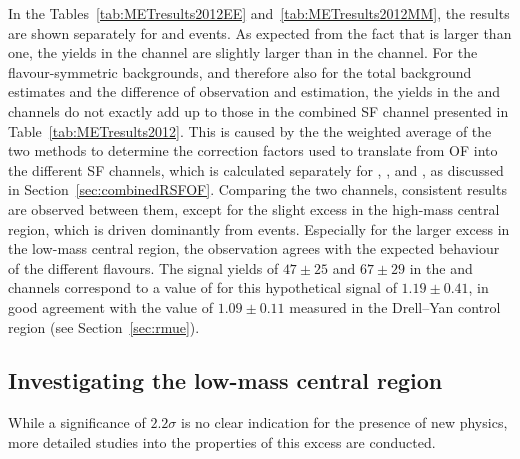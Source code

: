 
In the Tables~\ref{tab:METresults2012EE} and~\ref{tab:METresults2012MM}, the results are shown separately for \EE and \MM events. As expected from the fact that \rmue is larger than one, the yields in the \MM channel are slightly larger than in the \EE channel. For the flavour-symmetric backgrounds, and therefore also for the total background estimates and the difference of observation and estimation, the yields in the \EE and \MM channels do not exactly add up to those in the combined SF channel presented in Table~\ref{tab:METresults2012}. This is caused by the the weighted average of the two methods to determine the correction factors used to translate from OF into the different SF channels, which is calculated separately for \Rsfof, \Reeof, and \Rmmof, as discussed in Section~\ref{sec:combinedRSFOF}. Comparing the two channels, consistent results are observed between them, except for the slight excess in the high-mass central region, which is driven dominantly from \EE events. Especially for the larger excess in the low-mass central region, the observation agrees with the expected behaviour of the different flavours. The signal yields of $47\pm25$ and $67\pm29$ in the \EE and \MM channels correspond to a value of \rmue for this hypothetical signal of $1.19\pm0.41$, in good agreement with the value of $1.09\pm0.11$ measured in the Drell--Yan control region (see Section~\ref{sec:rmue}).





\subsection*{Investigating the low-mass central region}
While a significance of $2.2\sigma$ is no clear indication for the presence of new physics, more detailed studies into the properties of this excess are conducted. 

